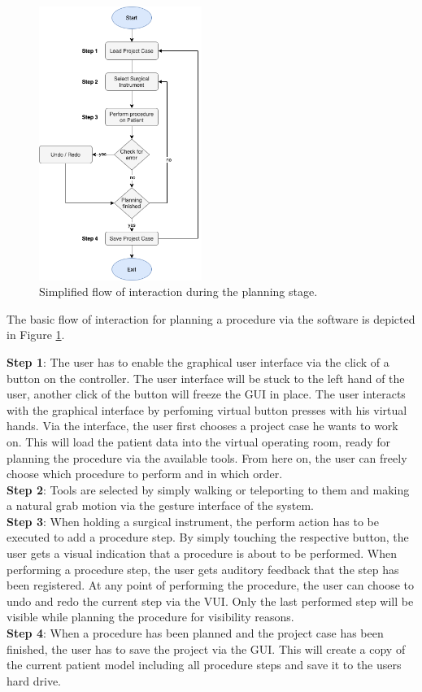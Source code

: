 \begin{figure}[ht]
    \centering
    \includegraphics[width=200px]{images/implementation/interaction_flow.png}
    \caption{\label{fig::InteractionFlow}Simplified flow of interaction during the planning stage.}
\end{figure}

The basic flow of interaction for planning a procedure via the software is depicted in Figure \ref{fig::InteractionFlow}.

\textbf{Step 1}: The user has to enable the graphical user interface via the click of a button on the controller.
The user interface will be stuck to the left hand of the user, another click of the button will freeze the GUI in place.
The user interacts with the graphical interface by perfoming virtual button presses with his virtual hands.
Via the interface, the user first chooses a project case he wants to work on.
This will load the patient data into the virtual operating room, ready for planning the procedure via the available tools.
From here on, the user can freely choose which procedure to perform and in which order.
\\
\textbf{Step 2}: Tools are selected by simply walking or teleporting to them and making a natural grab motion via the gesture interface of the system.
\\
\textbf{Step 3}: When holding a surgical instrument, the perform action has to be executed to add a procedure step.
By simply touching the respective button, the user gets a visual indication that a procedure is about to be performed.
When performing a procedure step, the user gets auditory feedback that the step has been registered.
At any point of performing the procedure, the user can choose to undo and redo the current step via the VUI.
Only the last performed step will be visible while planning the procedure for visibility reasons.
\\
\textbf{Step 4}: When a procedure has been planned and the project case has been finished, the user has to save the project via the GUI.
This will create a copy of the current patient model including all procedure steps and save it to the users hard drive.
